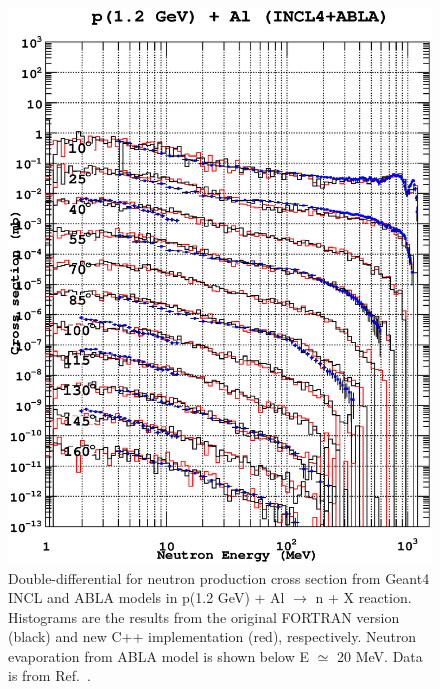 \documentclass[a4paper]{jpconf}
\begin{document}
\begin{figure}
\begin{center}
\includegraphics[scale=0.70]{poster/images/aluminum.eps}
\caption{\label{fig:neutronAl}Double-differential for neutron production cross section
    from Geant4 INCL and ABLA models in p(1.2 GeV) + Al $\rightarrow$ n + X reaction.
Histograms are the results from the original FORTRAN version (black) and new C++ implementation (red), respectively. 
Neutron evaporation from ABLA model is shown below E $\simeq$ 20 MeV.
Data is from Ref.~\cite{data}.} %

\end{center}

\end{figure}
\end{document}
